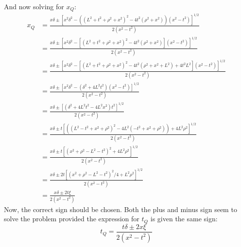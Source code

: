 \documentclass[12pt,a4]{article}
\begin{document}
\begin{enumerate}
\begin{enumerate}
        And now solving for $x_Q$:
        \begin{align*}
          x_Q   &= \frac{x\delta \pm \left[x^2\delta^2 - ((L^2 + t^2 + \rho^2 + x^2)^2 - 4 t^2 ( \rho^2 + x^2)) (x^2 - t^2)\right]^{1/2}}{2(x^2 - t^2)}\\
                &= \frac{x\delta \pm \left[x^2\delta^2 - \left[(L^2 + t^2 + \rho^2 + x^2)^2 - 4 t^2 ( \rho^2 + x^2)\right] (x^2 - t^2)\right]^{1/2}}{2(x^2 - t^2)}\\
                &= \frac{x\delta \pm \left[x^2\delta^2 - \left[(L^2 + t^2 + \rho^2 + x^2)^2 - 4 t^2 (\rho^2 + x^2 + L^2) + 4t^2L^2\right] (x^2 - t^2)\right]^{1/2}}{2(x^2 - t^2)}\\
                &= \frac{x\delta \pm \left[x^2\delta^2 - \left(\delta^2 + 4L^2t^2\right) (x^2 - t^2)\right]^{1/2}}{2(x^2 - t^2)}\\
                &= \frac{x\delta \pm \left[\left(\delta^2 + 4L^2t^2 - 4L^2 x^2 \right)t^2 \right]^{1/2}}{2(x^2 - t^2)}\\
                &= \frac{x\delta \pm t\left[\left((L^2 - t^2 + x^2 + \rho^2)^2 - 4L^2(-t^2 + x^2 + \rho^2)\right) + 4L^2 \rho^2 \right]^{1/2}}{2(x^2 - t^2)}\\
                &= \frac{x\delta \pm t\left[(x^2 + \rho^2 - L^2 - t^2) ^2  + 4L^2 \rho^2 \right]^{1/2}}{2(x^2 - t^2)}\\
                &= \frac{x\delta \pm 2t\left[(x^2 + \rho^2 - L^2 - t^2) ^2/4  + L^2 \rho^2 \right]^{1/2}}{2(x^2 - t^2)}\\
                &= \frac{x\delta \pm 2t\xi}{2(x^2 - t^2)}
        \end{align*}
        Now, the correct sign should be chosen.
        Both the plus and minus sign seem to solve the problem provided the expression for $t_Q$ is given the same sign:
        \begin{equation*}
          t_Q = \frac{t\delta \pm 2x\xi}{2(x^2 - t^2)}

\end{equation*}
\end{enumerate}
\end{enumerate}
\end{document}
